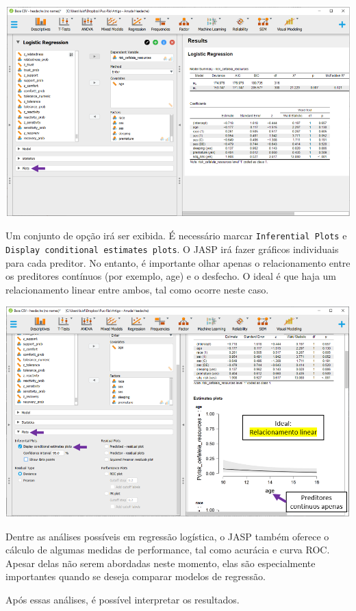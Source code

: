 \documentclass[
]{book}
\begin{document}
\includegraphics{./img/cap_logistica_assumptions_plot.png}

Um conjunto de opção irá ser exibida. É necessário marcar \texttt{Inferential\ Plots} e \texttt{Display\ conditional\ estimates\ plots}. O JASP irá fazer gráficos individuais para cada preditor. No entanto, é importante olhar apenas o relacionamento entre os preditores contínuos (por exemplo, age) e o desfecho. O ideal é que haja um relacionamento linear entre ambos, tal como ocorre neste caso.

\includegraphics{./img/cap_logistica_assumptions_plot2.png}

Dentre as análises possíveis em regressão logística, o JASP também oferece o cálculo de algumas medidas de performance, tal como acurácia e curva ROC. Apesar delas não serem abordadas neste momento, elas são especialmente importantes quando se deseja comparar modelos de regressão.

Após essas análises, é possível interpretar os resultados.
\end{document}
